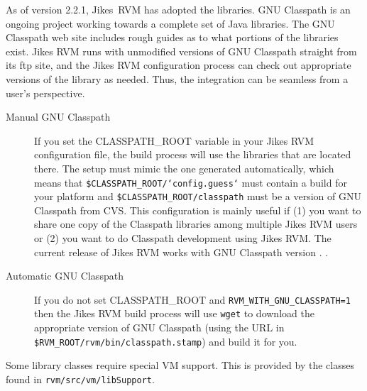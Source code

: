  As of version 2.2.1, Jikes\TMweb\ RVM has adopted the
 libraries.  GNU
Classpath is an ongoing project working towards a complete set of
Java\TMweb{} libraries.  The GNU Classpath web site includes
rough guides as to what portions of the libraries exist.  Jikes RVM
runs with unmodified versions of GNU Classpath straight from its ftp
site, and the Jikes RVM configuration process can check out
appropriate versions of the library as needed.  Thus, the integration
can be seamless from a user's perspective.

\begin{description}
\item[Manual GNU Classpath] If you set the CLASS\-PATH\_ROOT variable in
your Jikes RVM configuration file, the build process will use the
libraries that are located there.  The setup must mimic the one
generated automatically, which means that
{\tt \$CLASS\-PATH\_ROOT/\-`con\-fig.guess`} must contain a build for your platform
and {\tt \$CLASS\-PATH\_ROOT/\-class\-path} must be a version of GNU Classpath from
CVS.  This configuration is mainly useful if (1) you want to share one
copy of the Classpath libraries among multiple Jikes RVM users or (2)
you want to do Classpath development using Jikes RVM. The
current release of Jikes RVM works with GNU Classpath version
\classpathversion.  .

\item[Automatic GNU Classpath] If you do not set CLASS\-PATH\_\-ROOT and 
{\tt RVM\_\-WITH\_\-GNU\_\-CLASS\-PATH=1} then the Jikes RVM build process
will use {\tt wget} to download the appropriate version of GNU Classpath (using
the URL in {\tt \$RVM\_ROOT/\-rvm/\-bin/\-class\-path.stamp}) and build it for
you. 
\end{description}

Some library classes require special VM support.  This is provided by
the classes found in {\tt rvm/\-src/\-vm/\-lib\-Sup\-port}. 

